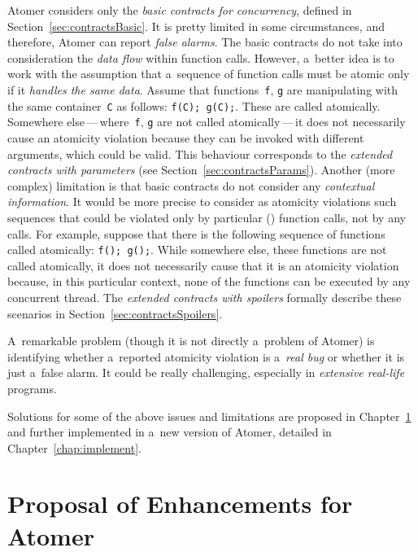 Atomer considers only the \emph{basic contracts for concurrency}, defined in Section~\ref{sec:contractsBasic}. It is pretty limited in some circumstances, and therefore, Atomer can report \emph{false alarms}. The basic contracts do not take into consideration the \emph{data flow} within function calls. However, a~better idea is to work with the assumption that a~sequence of function calls must be atomic only if it \emph{handles the same data}. Assume that functions~\texttt{f}, \texttt{g} are manipulating with the same container~\texttt{C} as follows: \texttt{f(C); g(C);}. These are called atomically. Somewhere else\,---\,where~\texttt{f}, \texttt{g} are not called atomically\,---\,it does not necessarily cause an atomicity violation because they can be invoked with different arguments, which could be valid. This behaviour corresponds to the \emph{extended contracts with parameters} (see Section~\ref{sec:contractsParams}). Another (more complex) limitation is that basic contracts do not consider any \emph{contextual information}. It would be more precise to consider as atomicity violations such sequences that could be violated only by particular () function calls, not by any calls. For example, suppose that there is the following sequence of functions called atomically: \texttt{f(); g();}. While somewhere else, these functions are not called atomically, it does not necessarily cause that it is an atomicity violation because, in this particular context, none of the  functions can be executed by any concurrent thread. The \emph{extended contracts with spoilers} formally describe these scenarios in Section~\ref{sec:contractsSpoilers}.

A~remarkable problem (though it is not directly a~problem of Atomer) is identifying whether a~reported atomicity violation is a~\emph{real bug} or whether it is just a~false alarm. It could be really challenging, especially in \emph{extensive real-life} programs.

Solutions for some of the above issues and limitations are proposed in Chapter~\ref{chap:proposal} and further implemented in a~new version of Atomer, detailed in Chapter~\ref{chap:implement}.






\chapter{Proposal of Enhancements for Atomer}
\label{chap:proposal}

